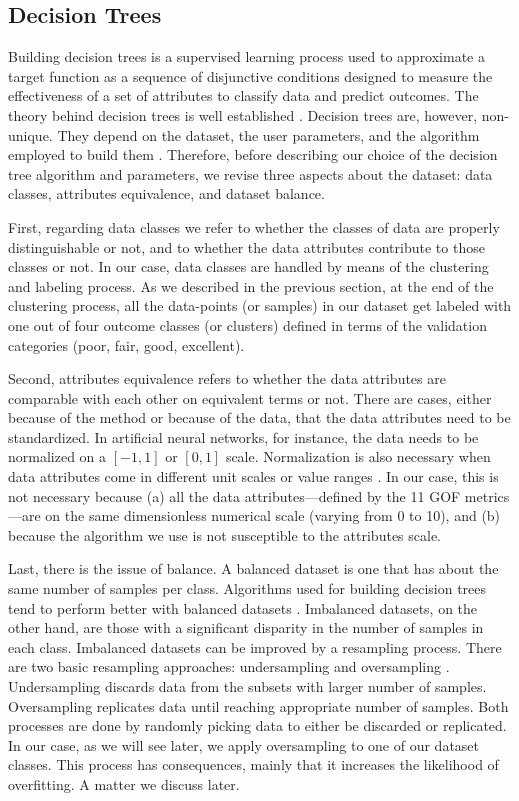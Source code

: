 
\subsection{Decision Trees}
\label{sec:decision-tree}

Building decision trees is a supervised learning process used to approximate a target function as a sequence of disjunctive conditions designed to measure the effectiveness of a set of attributes to classify data and predict outcomes. The theory behind decision trees is well established \citep[e.g.,][]{Quinlan_1986_ML, Mitchell_1997_Book}. Decision trees are, however, non-unique. They depend on the dataset, the user parameters, and the algorithm employed to build them \citep{Murthy_1998_DMKD}. Therefore, before describing our choice of the decision tree algorithm and parameters, we revise three aspects about the dataset: data classes, attributes equivalence, and dataset balance.

First, regarding data classes we refer to whether the classes of data are properly distinguishable or not, and to whether the data attributes contribute to those classes or not. In our case, data classes are handled by means of the clustering and labeling process. As we described in the previous section, at the end of the clustering process, all the data-points (or samples) in our dataset get labeled with one out of four outcome classes (or clusters) defined in terms of the validation categories (poor, fair, good, excellent).

Second, attributes equivalence refers to whether the data attributes are comparable with each other on equivalent terms or not. There are cases, either because of the method or because of the data, that the data attributes need to be standardized. In artificial neural networks, for instance, the data needs to be normalized on a $[-1,1]$ or $[0,1]$ scale. Normalization is also necessary when data attributes come in different unit scales or value ranges \citep[e.g.,][]{Wu_2010_JH}. In our case, this is not necessary because (a) all the data attributes---defined by the 11 GOF metrics---are on the same dimensionless numerical scale (varying from 0 to 10), and (b) because the algorithm we use is not susceptible to the attributes scale.

Last, there is the issue of balance. A balanced dataset is one that has about the same number of samples per class. Algorithms used for building decision trees tend to perform better with balanced datasets \citep[e.g.,][]{Branco_2016_ACMCS, Weiss_2003_JAIR}. Imbalanced datasets, on the other hand, are those with a significant disparity in the number of samples in each class. Imbalanced datasets can be improved by a resampling process. There are two basic resampling approaches: undersampling and oversampling \citep{Branco_2016_ACMCS}. Undersampling discards data from the subsets with larger number of samples. Oversampling replicates data until reaching appropriate number of samples. Both processes are done by randomly picking data to either be discarded or replicated. In our case, as we will see later, we apply oversampling to one of our dataset classes. This process has consequences, mainly that it increases the likelihood of overfitting. A matter we discuss later. 


